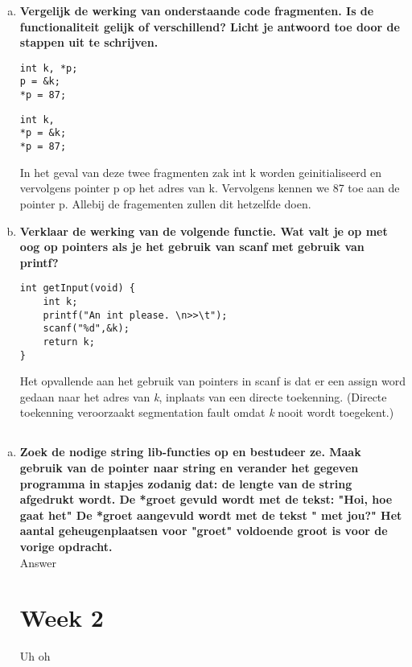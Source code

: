 \documentclass[10pt,a4paper]{report}
\begin{document}
\begin{enumerate}[(a)]
\item \textbf{Vergelijk de werking van onderstaande code fragmenten. Is de functionaliteit gelijk of 
verschillend? Licht je antwoord toe door de stappen uit te schrijven.}
\begin{lstlisting}
int k, *p;
p = &k;
*p = 87;
\end{lstlisting}
\begin{lstlisting}
int k, 
*p = &k;
*p = 87;
\end{lstlisting}
In het geval van deze twee fragmenten zak int k worden geinitialiseerd en vervolgens pointer p op het adres van k. Vervolgens kennen we 87 toe aan de pointer p. Allebij de fragementen zullen dit hetzelfde doen.
\newpage
\item \textbf{Verklaar de werking van de volgende functie. Wat valt je op met oog op pointers als je het gebruik van scanf met gebruik van printf?}
\begin{lstlisting}
int getInput(void) {
	int k;
	printf("An int please. \n>>\t");
	scanf("%d",&k);
	return k;
}
\end{lstlisting}
Het opvallende aan het gebruik van pointers in scanf is dat er een assign word gedaan naar het adres van \textit{k}, inplaats van een directe toekenning. (Directe toekenning veroorzaakt segmentation fault omdat \textit{k} nooit wordt toegekent.) 
\end{enumerate}
\section{}
\begin{enumerate}[(a)]
\item \textbf{Zoek de nodige string lib-functies op en bestudeer ze.
Maak gebruik van de pointer naar string en verander het gegeven programma in stapjes zodanig dat: 
de lengte van de string afgedrukt wordt.
De *groet gevuld wordt met de tekst: "Hoi, hoe gaat het"
De *groet aangevuld wordt met de tekst " met jou?"
Het aantal geheugenplaatsen voor "groet" voldoende groot is voor de vorige opdracht.}
\\
Answer
\newpage
\chapter*{Week 2}

Uh oh


\end{enumerate}
\end{document}
